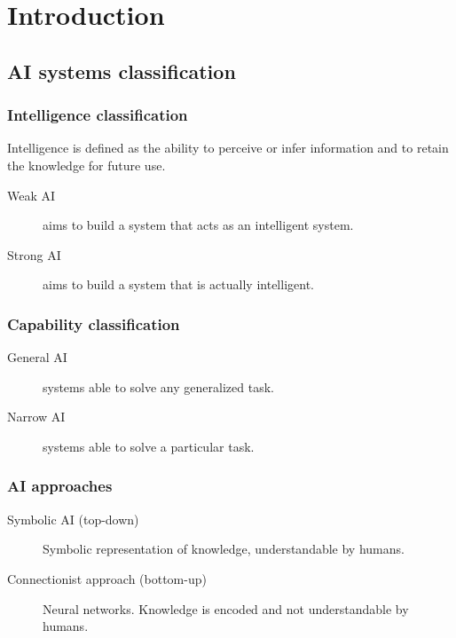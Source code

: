 \chapter{Introduction}


\section{AI systems classification}

\subsection{Intelligence classification}
Intelligence is defined as the ability to perceive or infer information and to retain the knowledge for future use.

\begin{description}
    \item[Weak AI] 
        aims to build a system that acts as an intelligent system. 
    
        \item[Strong AI] 
        aims to build a system that is actually intelligent. 
\end{description}


\subsection{Capability classification}
\begin{description}
    \item[General AI] 
        systems able to solve any generalized task. 
    
        \item[Narrow AI] 
        systems able to solve a particular task. 
\end{description}


\subsection{AI approaches}
\begin{description}
    \item[Symbolic AI (top-down)] 
        Symbolic representation of knowledge, understandable by humans.

    \item[Connectionist approach (bottom-up)] 
        Neural networks. Knowledge is encoded and not understandable by humans.
\end{description}



